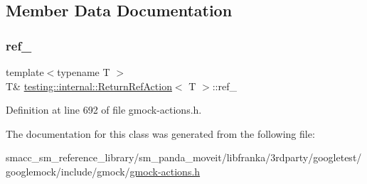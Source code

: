 \subsection{Member Data Documentation}
\mbox{\label{classtesting_1_1internal_1_1ReturnRefAction_ad63d08b72518c2059e0cc99c006cd620}} 
\subsubsection{\texorpdfstring{ref\+\_\+}{ref\_}}
{\footnotesize\ttfamily template$<$typename T $>$ \\
T\& \hyperlink{classtesting_1_1internal_1_1ReturnRefAction}{testing\+::internal\+::\+Return\+Ref\+Action}$<$ T $>$\+::ref\+\_\+\hspace{0.3cm}{\ttfamily [private]}}



Definition at line 692 of file gmock-\/actions.\+h.



The documentation for this class was generated from the following file\+:\begin{DoxyCompactItemize}
\item 
smacc\+\_\+sm\+\_\+reference\+\_\+library/sm\+\_\+panda\+\_\+moveit/libfranka/3rdparty/googletest/googlemock/include/gmock/\hyperlink{gmock-actions_8h}{gmock-\/actions.\+h}\end{DoxyCompactItemize}
